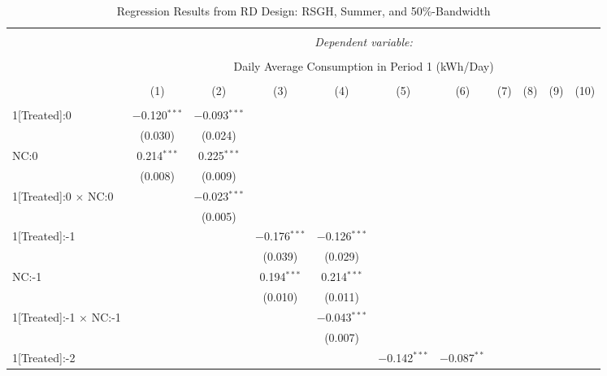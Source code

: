 \begin{table}[!htbp]
\centering 
\caption{Regression Results from RD Design: RSGH, Summer, and 50\%-Bandwidth} 
\label{} 
\footnotesize
\begin{adjustbox}{scale = 0.75}
\begin{tabular}{@{\extracolsep{5pt}}lcccccccccc} 
\\[-1.8ex]\hline 
\hline \\[-1.8ex] 
 & \multicolumn{10}{c}{\textit{Dependent variable:}} \\ 
\cline{2-11} 
\\[-1.8ex] & \multicolumn{10}{c}{Daily Average Consumption in Period 1 (kWh/Day)} \\ 
\\[-1.8ex] & (1) & (2) & (3) & (4) & (5) & (6) & (7) & (8) & (9) & (10)\\ 
\hline \\[-1.8ex] 
 1[Treated]:0 & $-$0.120$^{***}$ & $-$0.093$^{***}$ &  &  &  &  &  &  &  &  \\ 
  & (0.030) & (0.024) &  &  &  &  &  &  &  &  \\ 
 NC:0 & 0.214$^{***}$ & 0.225$^{***}$ &  &  &  &  &  &  &  &  \\ 
  & (0.008) & (0.009) &  &  &  &  &  &  &  &  \\ 
 1[Treated]:0 $\times$ NC:0 &  & $-$0.023$^{***}$ &  &  &  &  &  &  &  &  \\ 
  &  & (0.005) &  &  &  &  &  &  &  &  \\ 
 1[Treated]:-1 &  &  & $-$0.176$^{***}$ & $-$0.126$^{***}$ &  &  &  &  &  &  \\ 
  &  &  & (0.039) & (0.029) &  &  &  &  &  &  \\ 
 NC:-1 &  &  & 0.194$^{***}$ & 0.214$^{***}$ &  &  &  &  &  &  \\ 
  &  &  & (0.010) & (0.011) &  &  &  &  &  &  \\ 
 1[Treated]:-1 $\times$ NC:-1 &  &  &  & $-$0.043$^{***}$ &  &  &  &  &  &  \\ 
  &  &  &  & (0.007) &  &  &  &  &  &  \\ 
 1[Treated]:-2 &  &  &  &  & $-$0.142$^{***}$ & $-$0.087$^{**}$ &  &  &  &  \\ 

\end{tabular}
\end{adjustbox}
\end{table}
